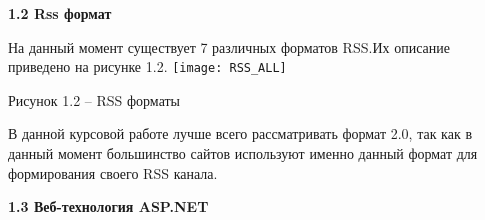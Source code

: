 \documentclass[14pt,a4paper]{extreport}
\begin{document}
	\flushleft\hspace{4ex}\textbf{1.2  Rss формат}\par
           \flushleft\hspace{4ex}На данный момент существует 7 различных форматов RSS.Их описание приведено на рисунке 1.2.
           \center \texttt{[image: RSS\_ALL]}\par
	\center Рисунок 1.2 – RSS форматы\par
\flushleft\hspace {4ex}В данной курсовой работе лучше всего рассматривать формат 2.0, так как в данный момент большинство сайтов используют именно данный формат для формирования своего RSS канала.    


	\flushleft\hspace{4ex}\textbf{1.3 Веб-технология ASP.NET}
\end{document}
